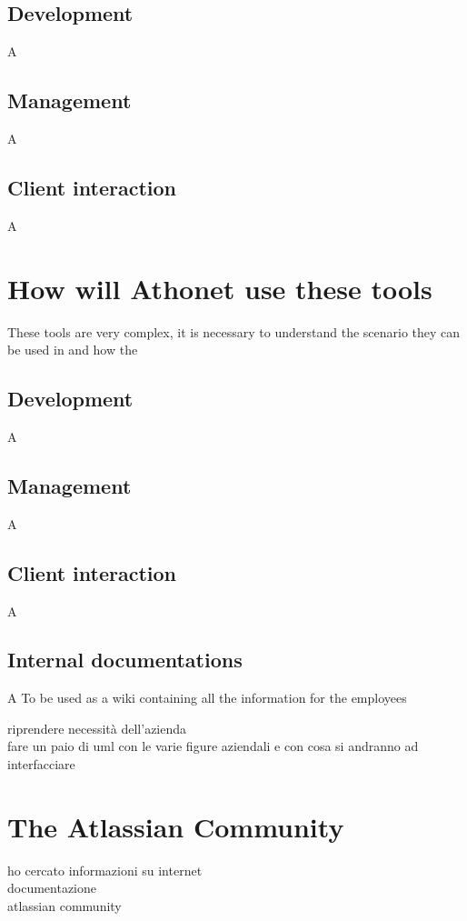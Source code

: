 	\subsection{Development} 
		A
		
	\subsection{Management} 
		A
		
	\subsection{Client interaction} 
		A

\section{How will Athonet use these tools}

	These tools are very complex, it is necessary to understand the scenario they can be used in and how the

	\subsection{Development} 
		A
	
	\subsection{Management} 
		A
	
	\subsection{Client interaction} 
		A
		
	\subsection{Internal documentations}
		A
		To be used as a wiki containing all the information for the employees

riprendere necessità dell'azienda\\
fare un paio di uml con le varie figure aziendali e con cosa si andranno ad interfacciare

\section{The Atlassian Community}
ho cercato informazioni su internet\\
documentazione\\
atlassian community
